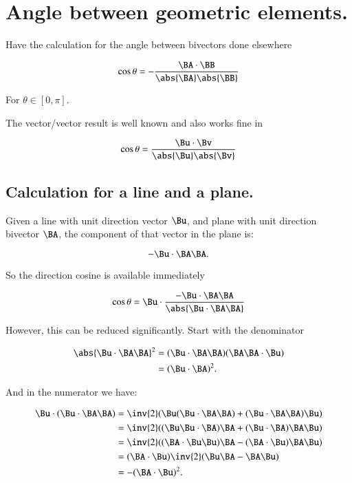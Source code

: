 \chapter{Angle between geometric elements.}
\date{ Mar 17, 2008.  Last Revision: $Date: 2009/06/04 13:13:27 $ }

Have the calculation for the angle between bivectors done elsewhere

\begin{equation}\label{eqn:angleLinePlane:bivectorangle}
\cos\theta = - \frac{\BA \cdot \BB}{\abs{\BA} \abs{\BB} }
\end{equation}

For $\theta \in [0,\pi]$.

The vector/vector result is well known and also works fine in 

\begin{equation}\label{eqn:angleLinePlane:vectorangle}
\cos\theta = \frac{\Bu \cdot \Bv}{\abs{\Bu} \abs{\Bv} }
\end{equation}

\section{Calculation for a line and a plane.}

Given a line with unit direction vector $\Bu$, and plane with unit direction bivector $\BA$, the component of that
vector in the plane is:

\[
-\Bu \cdot \BA \BA.
\]

So the direction cosine is available immediately

\[
\cos\theta = \Bu \cdot \frac{-\Bu \cdot \BA \BA}{\abs{\Bu \cdot \BA \BA}}
\]

However, this can be reduced significantly.  Start with the denominator

\begin{align*}
\abs{\Bu \cdot \BA \BA}^2
&= (\Bu \cdot \BA \BA)(\BA \BA \cdot \Bu) \\
&= (\Bu \cdot \BA )^2. \\
\end{align*}

And in the numerator we have:

\begin{align*}
\Bu \cdot (\Bu \cdot \BA \BA)
&= \inv{2}(
  \Bu (\Bu \cdot \BA \BA)
+ (\Bu \cdot \BA \BA) \Bu 
) \\
&= \inv{2}(
  (\Bu \Bu \cdot \BA) \BA
+ (\Bu \cdot \BA) \BA \Bu 
) \\
&= \inv{2}(
  (\BA \cdot \Bu \Bu) \BA
- (\BA \cdot \Bu) \BA \Bu 
) \\
&= (\BA \cdot \Bu) \inv{2}( \Bu \BA - \BA \Bu ) \\
&= -(\BA \cdot \Bu)^2.
\end{align*}

